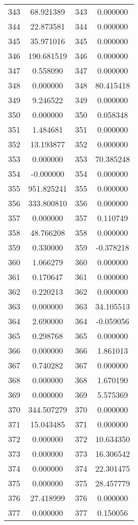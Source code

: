 \documentclass[12pt]{article}
\begin{document}
\begin{longtable}{@{}cccc@{}}
343 & 68.921389 & 343 & 0.000000 \\
344 & 22.873581 & 344 & 0.000000 \\
345 & 35.971016 & 345 & 0.000000 \\
346 & 190.681519 & 346 & 0.000000 \\
347 & 0.558090 & 347 & 0.000000 \\
348 & 0.000000 & 348 & 80.415418 \\
349 & 9.246522 & 349 & 0.000000 \\
350 & 0.000000 & 350 & 0.058348 \\
351 & 1.484681 & 351 & 0.000000 \\
352 & 13.193877 & 352 & 0.000000 \\
353 & 0.000000 & 353 & 70.385248 \\
354 & -0.000000 & 354 & 0.000000 \\
355 & 951.825241 & 355 & 0.000000 \\
356 & 333.800810 & 356 & 0.000000 \\
357 & 0.000000 & 357 & 0.110749 \\
358 & 48.766208 & 358 & 0.000000 \\
359 & 0.330000 & 359 & -0.378218 \\
360 & 1.066279 & 360 & 0.000000 \\
361 & 0.170647 & 361 & 0.000000 \\
362 & 0.220213 & 362 & 0.000000 \\
363 & 0.000000 & 363 & 34.105513 \\
364 & 2.690000 & 364 & -0.059056 \\
365 & 0.298768 & 365 & 0.000000 \\
366 & 0.000000 & 366 & 1.861013 \\
367 & 0.740282 & 367 & 0.000000 \\
368 & 0.000000 & 368 & 1.670190 \\
369 & 0.000000 & 369 & 5.575369 \\
370 & 344.507279 & 370 & 0.000000 \\
371 & 15.043485 & 371 & 0.000000 \\
372 & 0.000000 & 372 & 10.634350 \\
373 & 0.000000 & 373 & 16.306542 \\
374 & 0.000000 & 374 & 22.301475 \\
375 & 0.000000 & 375 & 28.457779 \\
376 & 27.418999 & 376 & 0.000000 \\
377 & 0.000000 & 377 & 0.150056 \\

\end{longtable}
\end{document}
